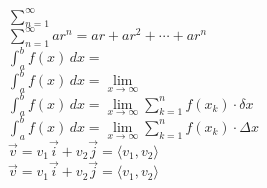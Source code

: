 \documentclass[11pt]{article}
\begin{document}
$\displaystyle{\sum \limits_{n=1}^{\infty}}$\\

$\displaystyle{\sum \limits_{n=1}^{\infty}ar^n=ar+ar^2+ \cdots +ar^n}$\\

$\displaystyle{\int_a^b f(x) \,dx=}$\\

$\displaystyle{\int_a^b f(x) \,dx=\lim \limits_{x \to \infty}}$\\

$\displaystyle{\int_a^b f(x) \,dx=\lim \limits_{x \to \infty} \sum \limits_{k=1}^{n}f(x_k)\cdot \delta x}$\\

$\displaystyle{\int_a^b f(x) \,dx=\lim \limits_{x \to \infty} \sum \limits_{k=1}^{n}f(x_k)\cdot \Delta x}$\\

$\vec{v}=v_1 \vec{i}+v_2 \vec{j}=\langle v_1, v_2 \rangle$\\

$\displaystyle\vec{v}=v_1 \vec{i}+v_2 \vec{j}=\langle v_1, v_2 \rangle$\\

\end{document}
